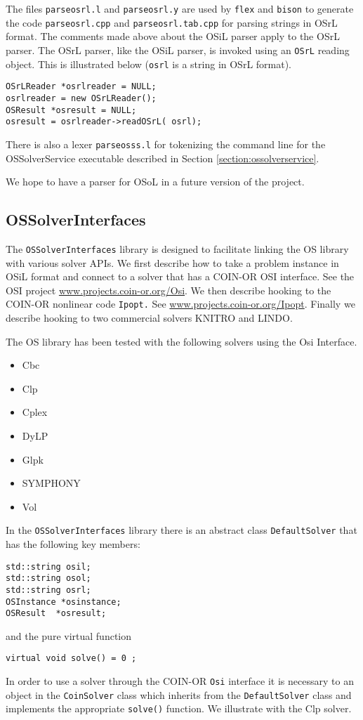\documentclass[11pt]{article}
\renewcommand{\_}{{\char"5F}}
\renewcommand{\{}{{\char"7B}}
\renewcommand{\}}{{\char"7D}}
\renewcommand{\^}{{\char"0D}}
\renewcommand{\'}{{\char"0D}}
\begin{document}
The files {\tt parseosrl.l} and {\tt parseosrl.y} are used by {\tt flex} and {\tt bison} to  generate the code {\tt parseosrl.cpp} and {\tt parseosrl.tab.cpp} for parsing strings in OSrL format. The comments made above about the OSiL parser apply to the OSrL parser. The OSrL parser, like the OSiL parser, is invoked using an {\tt OSrL} reading object. This is illustrated below ({\tt osrl} is a string in OSrL format).
\begin{verbatim}
OSrLReader *osrlreader = NULL;
osrlreader = new OSrLReader();
OSResult *osresult = NULL;
osresult = osrlreader->readOSrL( osrl);
\end{verbatim}

There is also a lexer {\tt parseosss.l} for tokenizing the command line for the OSSolverService executable described in Section \ref{section:ossolverservice}.

We hope to have a parser for OSoL  in a future version of the project.


\subsection{OSSolverInterfaces}\label{section:ossolverinterfaces}


The {\tt OSSolverInterfaces} library is designed to facilitate linking the OS library with various solver APIs. We first describe how to take a problem instance in OSiL format and connect to a solver that has a COIN-OR OSI interface.  See the OSI project \url{www.projects.coin-or.org/Osi}.   We then describe hooking to the COIN-OR nonlinear code {\tt Ipopt.} See \url{www.projects.coin-or.org/Ipopt}.  Finally we describe hooking to two commercial solvers KNITRO and LINDO.

The OS library has been tested with the following solvers using the Osi Interface.

\begin{itemize}
\item Cbc
\item Clp
\item Cplex
\item DyLP
\item Glpk
\item SYMPHONY
\item Vol
\end{itemize}

In the {\tt OSSolverInterfaces} library there is an abstract class {\tt DefaultSolver} that has the following key members:

\begin{verbatim}
std::string osil;
std::string osol;
std::string osrl;
OSInstance *osinstance;
OSResult  *osresult;
\end{verbatim}
and the pure virtual function
\begin{verbatim}
virtual void solve() = 0 ;	
\end{verbatim}
In order to use a solver through the COIN-OR {\tt Osi} interface it is necessary to an object in the {\tt CoinSolver} class which inherits from the {\tt DefaultSolver} class and implements the appropriate {\tt solve()} function.  We illustrate with the Clp solver.
\end{document}
